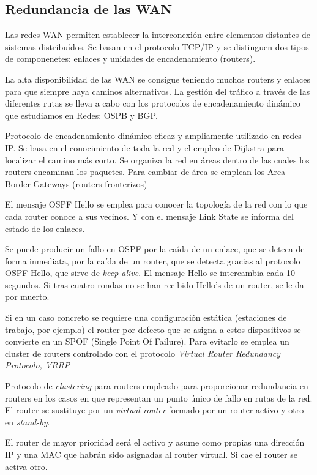 \documentclass{apuntes}[nochap]
\begin{document}
\subsection{Redundancia de las WAN}
Las redes WAN permiten establecer la interconexión entre elementos distantes de sistemas distribuídos. Se basan en el protocolo TCP/IP y se distinguen dos tipos de componenetes: enlaces y unidades de encadenamiento (routers).

La alta disponibilidad de las WAN se consigue teniendo muchos routers y enlaces para que siempre haya caminos alternativos. La gestión del tráfico a través de las diferentes rutas se lleva a cabo con los protocolos de encadenamiento dinámico que estudiamos en Redes: OSPB y BGP.

\begin{defn}[OSPF]
Protocolo de encadenamiento dinámico eficaz y ampliamente utilizado en redes IP. Se basa en el conocimiento de toda la red y el empleo de Dijkstra para localizar el camino más corto. Se organiza la red en áreas dentro de las cuales los routers encaminan los paquetes. Para cambiar de área se emplean los Area Border Gateways (routers fronterizos)

El mensaje OSPF Hello se emplea para conocer la topología de la red con lo que cada router conoce a sus vecinos. Y con el mensaje Link State se informa del estado de los enlaces.
\end{defn}

Se puede producir un fallo en OSPF por la caída de un enlace, que se deteca de forma inmediata, por la caída de un router, que se detecta gracias al protocolo OSPF Hello, que sirve de \textit{keep-alive}. El mensaje Hello se intercambia cada 10 segundos. Si tras cuatro rondas no se han recibido Hello's de un router, se le da por muerto.

Si en un caso concreto se requiere una configuración estática (estaciones de trabajo, por ejemplo) el router por defecto que se asigna a estos dispositivos se convierte en un SPOF (Single Point Of Failure). Para evitarlo se emplea un cluster de routers controlado con el protocolo \textit{Virtual Router Redundancy Protocolo, VRRP}

\begin{defn}[VRRP]
Protocolo de \textit{clustering} para routers empleado para proporcionar redundancia en routers en los casos en que representan un punto único de fallo en rutas de la red. El router se sustituye por un \textit{virtual router} formado por un router activo y otro en \textit{stand-by}.

El router de mayor prioridad será el activo y asume como propias una dirección IP y una MAC que habrán sido asignadas al router virtual. Si cae el router se activa otro.
\end{defn}
\end{document}
